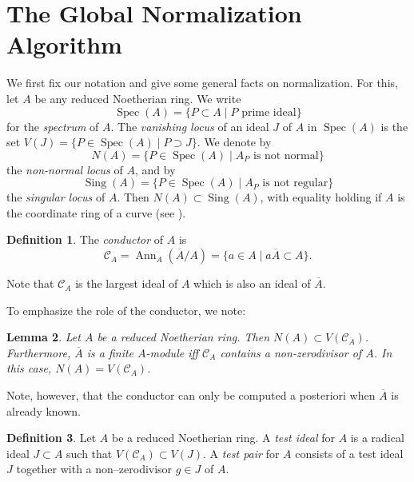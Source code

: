\documentclass[a4paper,11pt]{amsart}%
\theoremstyle{definition}
\newtheorem{defn}{Definition}[section]
\theoremstyle{plain}
\newtheorem{lemma}[defn]{Lemma}
\theoremstyle{remark}
\DeclareMathOperator{\Spec}{Spec}
\DeclareMathOperator{\Sing}{Sing}
\DeclareMathOperator{\Ann}{Ann}
\begin{document}
\section{The Global Normalization Algorithm}

\label{sect:Int-basis-via-norm}

We first fix our notation and give some general facts on normalization. For
this, let $A$ be any reduced Noetherian ring. We write
\[
\Spec(A)=\{P\subset A\mid P{\text{ prime ideal}}\}
\]
for the {\emph{spectrum}} of $A$. The {\emph{vanishing locus}} of an ideal $J$
of $A$ in $\Spec(A)$ is the set $V(J)=\{P\in\Spec(A)\mid P\supset J\}$. We
denote by
\[
N(A)=\{P\in\operatorname{Spec}(A)\mid A_{P}\text{ is not normal}\}
\]
the {\emph{non-normal locus}} of $A$, and by
\[
\operatorname{Sing}(A)=\{P\in\operatorname{Spec}(A)\mid A_{P}\text{ is not
regular}\}
\]
the {\emph{singular locus}} of $A$. Then $N(A)\subset\Sing(A)$, with equality
holding if $A$ is the coordinate ring of a curve (see \cite[Theorem 4.4.9]{JP}).

\begin{defn}
The \emph{conductor} of $A$ is
\[
\mathcal{C}_{A}=\Ann_{A}(\overline{A}/A)=\{a\in A\mid a\overline{A}\subset
A\}.
\]

\end{defn}

Note that $\mathcal{C}_{A}$ is the largest ideal of $A$ which is also an ideal
of $\overline{A}$.

To emphasize the role of the conductor, we note:

\begin{lemma}
\label{lemma:role-of-cond} Let $A$ be a reduced Noetherian ring. Then
$N(A)\subset V(\mathcal{C}_{A})$. Furthermore, $\overline{A}$ is a finite
$A$-module iff $\mathcal{C}_{A}$ contains a non-zerodivisor of $A$. In this
case, $N(A)=V(\mathcal{C}_{A})$.
\end{lemma}

Note, however, that the conductor can only be computed a posteriori when
$\overline{A}$ is already known.

\begin{defn}
\label{def:test-ideal} Let $A$ be a reduced Noetherian ring. A {\emph{test
ideal}} for $A$ is a radical ideal $J\subset A$ such that $V(\mathcal{C}%
_{A})\subset V(J)$. A {\emph{test pair}} for $A$ consists of a test ideal $J$
together with a non--zerodivisor $g\in J$ of $A$.
\end{defn}
\end{document}
